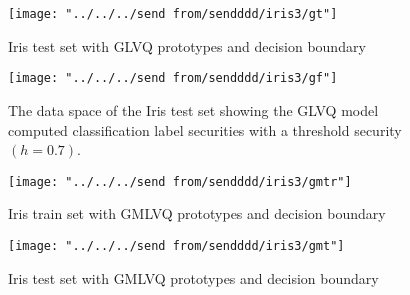 \documentclass[english]{HSMW-Thesis}
\begin{document}
\begin{figure}[H]
	\centering
	\texttt{[image: "../../../send from/sendddd/iris3/gt"]}
	\caption[Iris test set with GLVQ prototypes]{Iris test set with GLVQ prototypes and decision boundary}
	\label{fig:ig2}
\end{figure}


\begin{figure}[H]
	\centering
	\texttt{[image: "../../../send from/sendddd/iris3/gf"]}
	\caption[Iris test set classification label security (GLVQ)]{The data space of the Iris test set showing the GLVQ model computed classification label securities with a threshold security $(h=0.7)$.}
	\label{fig:igd1}
\end{figure}


\begin{figure}[H]
	\centering
	\texttt{[image: "../../../send from/sendddd/iris3/gmtr"]}
	\caption[Iris train set with GMLVQ prototypes]{Iris train set with GMLVQ prototypes and decision boundary}
	\label{fig:igm1}
\end{figure}

\begin{figure}[H]
	\centering
	\texttt{[image: "../../../send from/sendddd/iris3/gmt"]}
	\caption[Iris test set with GMLVQ prototypes]{Iris test set with GMLVQ prototypes and decision boundary}
	\label{fig:igm2}
\end{figure}


\end{document}
